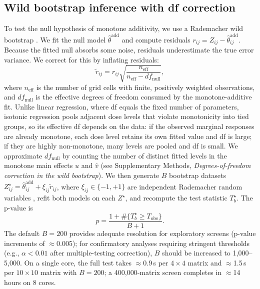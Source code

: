 \documentclass[pdflatex,sn-nature]{sn-jnl}%
\begin{document}
\subsection{Wild bootstrap inference with df correction}
To test the null hypothesis of monotone additivity, we use a Rademacher wild bootstrap \cite{Wu1986}.
We fit the null model $\hat\theta^{\mathrm{add}}$ and compute residuals $r_{ij}=Z_{ij}-\hat\theta^{\mathrm{add}}_{ij}$.
Because the fitted null absorbs some noise, residuals underestimate the true error variance.
We correct for this by inflating residuals:
\begin{equation}
\tilde r_{ij}=r_{ij}\sqrt{\frac{n_{\mathrm{eff}}}{n_{\mathrm{eff}}-df_{\mathrm{null}}}},
\end{equation}
where $n_{\mathrm{eff}}$ is the number of grid cells with finite, positively weighted observations, and $df_{\mathrm{null}}$ is the effective degrees of freedom consumed by the monotone-additive fit.
Unlike linear regression, where df equals the fixed number of parameters, isotonic regression pools adjacent dose levels that violate monotonicity into tied groups, so its effective df depends on the data: if the observed marginal responses are already monotone, each dose level retains its own fitted value and df is large; if they are highly non-monotone, many levels are pooled and df is small.
We approximate $df_{\mathrm{null}}$ by counting the number of distinct fitted levels in the monotone main effects $\hat u$ and $\hat v$ (see Supplementary Methods, \emph{Degrees-of-freedom correction in the wild bootstrap}).
We then generate $B$ bootstrap datasets $Z^\star_{ij}=\hat\theta^{\mathrm{add}}_{ij}+\xi_{ij}\tilde r_{ij}$, where $\xi_{ij}\in\{-1,+1\}$ are independent Rademacher random variables \cite{Wu1986,Mammen1993}, refit both models on each $Z^\star$, and recompute the test statistic $T^\star_b$.
The p-value is
\begin{equation}
p=\frac{1+\#\{T^\star_b\ge T_{\mathrm{obs}}\}}{B+1}.
\end{equation}
The default $B=200$ provides adequate resolution for exploratory screens (p-value increments of $\approx$0.005); for confirmatory analyses requiring stringent thresholds (e.g., $\alpha<0.01$ after multiple-testing correction), $B$ should be increased to 1{,}000--5{,}000.
On a single core, the full test takes $\approx$0.9\,s per $4\times 4$ matrix and $\approx$1.5\,s per $10\times 10$ matrix with $B=200$; a 400{,}000-matrix screen completes in $\approx$14 hours on 8 cores.
\end{document}
